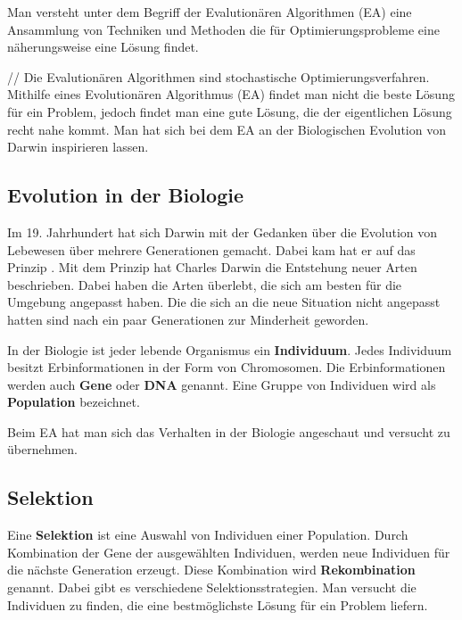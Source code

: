 
Man versteht unter dem Begriff der Evalution{\"a}ren Algorithmen (EA) eine Ansammlung von Techniken und Methoden die f{\"u}r Optimierungsprobleme eine n{\"a}herungsweise eine L{\"o}sung findet. \cite{weicker2015evolutionare} 

// Die Evalution{\"a}ren Algorithmen sind stochastische Optimierungsverfahren. Mithilfe eines Evolution{\"a}ren Algorithmus (EA) findet man nicht die beste L{\"o}sung f{\"u}r ein Problem, jedoch findet man eine gute L{\"o}sung, die der eigentlichen L{\"o}sung recht nahe kommt.
Man hat sich bei dem EA an der Biologischen Evolution von Darwin inspirieren lassen. \cite{selzam2003genetische}

\subsection{Evolution in der Biologie}
Im 19. Jahrhundert hat sich Darwin mit der Gedanken {\"u}ber die Evolution von Lebewesen {\"u}ber mehrere Generationen gemacht. Dabei kam hat er auf das Prinzip . Mit dem Prinzip hat Charles Darwin die Entstehung neuer Arten beschrieben. Dabei haben die Arten {\"u}berlebt, die sich am besten f{\"u}r die Umgebung angepasst haben. Die die sich an die neue Situation nicht angepasst hatten sind nach ein paar Generationen zur Minderheit geworden. \cite{hunermann2007brockhaus}

In der Biologie ist jeder lebende Organismus ein \textbf{Individuum}.
Jedes Individuum besitzt Erbinformationen in der Form von Chromosomen. Die Erbinformationen werden auch \textbf{Gene} oder \textbf{DNA} genannt. 
Eine Gruppe von Individuen wird als \textbf{Population} bezeichnet. 

Beim EA hat man sich das Verhalten in der Biologie angeschaut und versucht zu {\"u}bernehmen. \cite{flickevolutionare}


\subsection{Selektion}

Eine \textbf{Selektion} ist eine Auswahl von Individuen einer Population. Durch Kombination der Gene der ausgew{\"a}hlten Individuen, werden neue Individuen f{\"u}r die n{\"a}chste Generation erzeugt. Diese Kombination wird \textbf{Rekombination} genannt.
Dabei gibt es verschiedene Selektionsstrategien. Man versucht die Individuen zu finden, die eine bestm{\"o}glichste L{\"o}sung f{\"u}r ein Problem liefern. \cite{weicker2015evolutionare, flickevolutionare}

